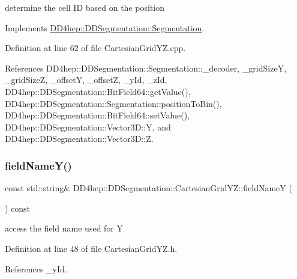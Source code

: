 determine the cell ID based on the position 



Implements \hyperlink{class_d_d4hep_1_1_d_d_segmentation_1_1_segmentation_ad5a60953d96d409850d8192f64f8ce3c}{D\+D4hep\+::\+D\+D\+Segmentation\+::\+Segmentation}.



Definition at line 62 of file Cartesian\+Grid\+Y\+Z.\+cpp.



References D\+D4hep\+::\+D\+D\+Segmentation\+::\+Segmentation\+::\+\_\+decoder, \+\_\+grid\+SizeY, \+\_\+grid\+SizeZ, \+\_\+offsetY, \+\_\+offsetZ, \+\_\+y\+Id, \+\_\+z\+Id, D\+D4hep\+::\+D\+D\+Segmentation\+::\+Bit\+Field64\+::get\+Value(), D\+D4hep\+::\+D\+D\+Segmentation\+::\+Segmentation\+::position\+To\+Bin(), D\+D4hep\+::\+D\+D\+Segmentation\+::\+Bit\+Field64\+::set\+Value(), D\+D4hep\+::\+D\+D\+Segmentation\+::\+Vector3\+D\+::Y, and D\+D4hep\+::\+D\+D\+Segmentation\+::\+Vector3\+D\+::Z.

\hypertarget{class_d_d4hep_1_1_d_d_segmentation_1_1_cartesian_grid_y_z_aafd2965e9e2b3f1ee7b30f504314e00f}{}\label{class_d_d4hep_1_1_d_d_segmentation_1_1_cartesian_grid_y_z_aafd2965e9e2b3f1ee7b30f504314e00f} 
\subsubsection{\texorpdfstring{field\+Name\+Y()}{fieldNameY()}}
{\footnotesize\ttfamily const std\+::string\& D\+D4hep\+::\+D\+D\+Segmentation\+::\+Cartesian\+Grid\+Y\+Z\+::field\+NameY (\begin{DoxyParamCaption}{ }\end{DoxyParamCaption}) const\hspace{0.3cm}{\ttfamily [inline]}}



access the field name used for Y 



Definition at line 48 of file Cartesian\+Grid\+Y\+Z.\+h.



References \+\_\+y\+Id.

\hypertarget{class_d_d4hep_1_1_d_d_segmentation_1_1_cartesian_grid_y_z_ae9e7e7d9e27f8dc09cd63ff7606ba092}{}\label{class_d_d4hep_1_1_d_d_segmentation_1_1_cartesian_grid_y_z_ae9e7e7d9e27f8dc09cd63ff7606ba092} 
